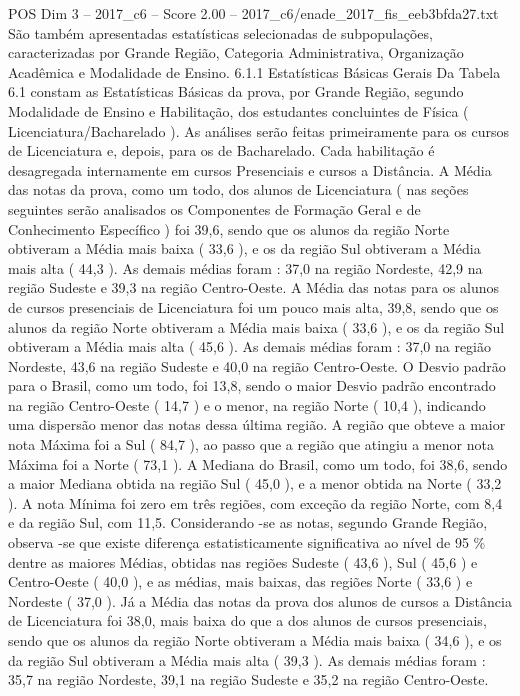 \begin{textsample}{POS Dim 3 – 2017\_c6 – Score 2.00 – 2017\_c6/enade\_2017\_fis\_eeb3bfda27.txt}
São também apresentadas estatísticas selecionadas de subpopulações, caracterizadas por Grande Região, Categoria Administrativa, Organização Acadêmica e Modalidade de Ensino. 6.1.1 Estatísticas Básicas Gerais Da Tabela 6.1 constam as Estatísticas Básicas da prova, por Grande Região, segundo Modalidade de Ensino e Habilitação, dos estudantes concluintes de Física ( Licenciatura/Bacharelado ).
As análises serão feitas primeiramente para os cursos de Licenciatura e, depois, para os de Bacharelado.
Cada habilitação é desagregada internamente em cursos Presenciais e cursos a Distância.
A Média das notas da prova, como um todo, dos alunos de Licenciatura ( nas seções seguintes serão analisados os Componentes de Formação Geral e de Conhecimento Específico ) foi 39,6, sendo que os alunos da região Norte obtiveram a Média mais baixa ( 33,6 ), e os da região Sul obtiveram a Média mais alta ( 44,3 ).
As demais médias foram : 37,0 na região Nordeste, 42,9 na região Sudeste e 39,3 na região Centro-Oeste.
A Média das notas para os alunos de cursos presenciais de Licenciatura foi um pouco mais alta, 39,8, sendo que os alunos da região Norte obtiveram a Média mais baixa ( 33,6 ), e os da região Sul obtiveram a Média mais alta ( 45,6 ).
As demais médias foram : 37,0 na região Nordeste, 43,6 na região Sudeste e 40,0 na região Centro-Oeste.
O Desvio padrão para o Brasil, como um todo, foi 13,8, sendo o maior Desvio padrão encontrado na região Centro-Oeste ( 14,7 ) e o menor, na região Norte ( 10,4 ), indicando uma dispersão menor das notas dessa última região.
A região que obteve a maior nota Máxima foi a Sul ( 84,7 ), ao passo que a região que atingiu a menor nota Máxima foi a Norte ( 73,1 ).
A Mediana do Brasil, como um todo, foi 38,6, sendo a maior Mediana obtida na região Sul ( 45,0 ), e a menor obtida na Norte ( 33,2 ).
A nota Mínima foi zero em três regiões, com exceção da região Norte, com 8,4 e da região Sul, com 11,5.
Considerando -se as notas, segundo Grande Região, observa -se que existe diferença estatisticamente significativa ao nível de 95 \% dentre as maiores Médias, obtidas nas regiões Sudeste ( 43,6 ), Sul ( 45,6 ) e Centro-Oeste ( 40,0 ), e as médias, mais baixas, das regiões Norte ( 33,6 ) e Nordeste ( 37,0 ).
Já a Média das notas da prova dos alunos de cursos a Distância de Licenciatura foi 38,0, mais baixa do que a dos alunos de cursos presenciais, sendo que os alunos da região Norte obtiveram a Média mais baixa ( 34,6 ), e os da região Sul obtiveram a Média mais alta ( 39,3 ).
As demais médias foram : 35,7 na região Nordeste, 39,1 na região Sudeste e 35,2 na região Centro-Oeste.

\end{textsample}
